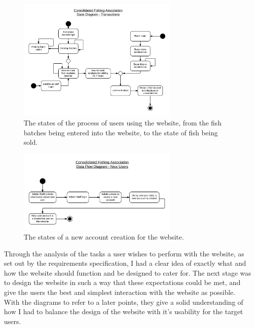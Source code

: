 \documentclass{article}
\begin{document}
\begin{figure}[H]
	\centering
	\includegraphics[width=0.7\textwidth]{img/TA-SD-Batches.png}
	\caption{The states of the process of users using the website, from the fish batches being entered into the website, to the state of fish being sold.}
\end{figure}

\begin{figure}[H]
	\centering
	\includegraphics[width=0.7\textwidth]{img/TA-SD-Users.png}
	\caption{The states of a new account creation for the website.}
\end{figure}

Through the analysis of the tasks a user wishes to perform with the website, as set out by the requirements specification, I had a clear idea of exactly what and how the website should function and be designed to cater for. The next stage was to design the website in such a way that these expectations could be met, and give the users the best and simplest interaction with the website as possible. With the diagrams to refer to a later points, they give a solid understanding of how I had to balance the design of the website with it's usability for the target users.

\clearpage

\end{document}
